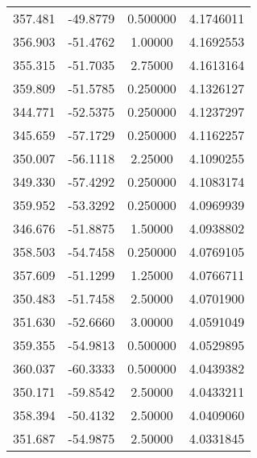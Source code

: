 \documentclass{article}
\begin{document}
\begin{tabular}{| c | c | c | c |}
      357.481 &      -49.8779 &      0.500000 &        4.1746011\\
      356.903 &      -51.4762 &       1.00000 &        4.1692553\\
      355.315 &      -51.7035 &       2.75000 &        4.1613164\\
      359.809 &      -51.5785 &      0.250000 &        4.1326127\\
      344.771 &      -52.5375 &      0.250000 &        4.1237297\\
      345.659 &      -57.1729 &      0.250000 &        4.1162257\\
      350.007 &      -56.1118 &       2.25000 &        4.1090255\\
      349.330 &      -57.4292 &      0.250000 &        4.1083174\\
      359.952 &      -53.3292 &      0.250000 &        4.0969939\\
      346.676 &      -51.8875 &       1.50000 &        4.0938802\\
      358.503 &      -54.7458 &      0.250000 &        4.0769105\\
      357.609 &      -51.1299 &       1.25000 &        4.0766711\\
      350.483 &      -51.7458 &       2.50000 &        4.0701900\\
      351.630 &      -52.6660 &       3.00000 &        4.0591049\\
      359.355 &      -54.9813 &      0.500000 &        4.0529895\\
      360.037 &      -60.3333 &      0.500000 &        4.0439382\\
      350.171 &      -59.8542 &       2.50000 &        4.0433211\\
      358.394 &      -50.4132 &       2.50000 &        4.0409060\\
      351.687 &      -54.9875 &       2.50000 &        4.0331845\\
      \hline
\end{tabular}
\end{document}
